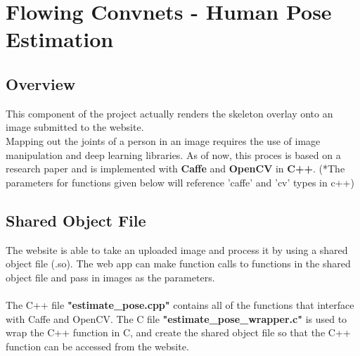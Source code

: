 \documentclass{scrreprt}
\begin{document}
\break

\section{Flowing Convnets - Human Pose Estimation}

\subsection{Overview}

This component of the project actually renders the skeleton overlay onto an image submitted to the website.
\\
Mapping out the joints of a person in an image requires the use of image manipulation and deep learning libraries. As of now, this proces is based on a research paper and is implemented with \textbf{Caffe} and \textbf{OpenCV} in \textbf{C++}. (*The parameters for functions given below will reference 'caffe' and 'cv' types in c++)


\subsection{Shared Object File}

The website is able to take an uploaded image and process it by using a shared object file (.so). The web app can make function calls to functions in the shared object file and pass in images as the parameters.
\\\\
The C++ file \textbf{"estimate\_pose.cpp"} contains all of the functions that interface with Caffe and OpenCV. The C file \textbf{"estimate\_pose\_wrapper.c"} is used to wrap the C++ function in C, and create the shared object file so that the C++ function can be accessed from the website.
\end{document}
